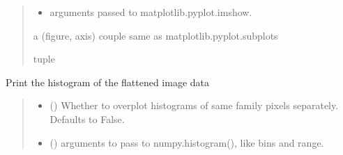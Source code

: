 \documentclass[letterpaper,10pt,english]{sphinxmanual}
\begin{document}
\begin{fulllineitems}
\begin{fulllineitems}
\begin{quote}
\begin{description}
\begin{itemize}
\item {} 
\sphinxAtStartPar
{} \textendash{} arguments passed to matplotlib.pyplot.imshow.

\end{itemize}

\sphinxAtStartPar
a (figure, axis) couple same as matplotlib.pyplot.subplots

\sphinxAtStartPar
tuple

\end{description}\end{quote}

\end{fulllineitems}


\begin{fulllineitems}
\label{\detokenize{micropolarray:micropolarray.micropol_image.MicropolImage.show_histogram}}
\pysigstartsignatures
{}
\pysigstopsignatures
\sphinxAtStartPar
Print the histogram of the flattened image data
\begin{quote}\begin{description}
\begin{itemize}
\item {} 
\sphinxAtStartPar
{} (\sphinxstyleliteralemphasis{\sphinxupquote{, }}) \textendash{} Whether to overplot histograms of same family pixels separately. Defaults to False.

\item {} 
\sphinxAtStartPar
{} (\sphinxstyleliteralemphasis{\sphinxupquote{, }}) \textendash{} arguments to pass to numpy.histogram(), like bins and range.

\end{itemize}


\end{description}
\end{quote}
\end{fulllineitems}
\end{fulllineitems}
\end{document}
